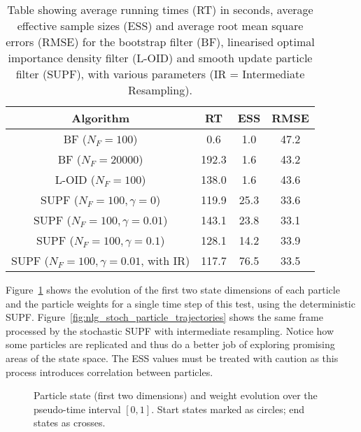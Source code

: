 \documentclass[a4paper,10pt]{article}
\newcommand{\lfdiffsf}{\gamma}                  %
\begin{document}
\begin{table}
\centering
\begin{tabular}{c||c|c|c}
Algorithm                                 & RT    & ESS  & RMSE \\
\hline
BF ($N_F=100$)                            & 0.6   & 1.0  & 47.2 \\
BF ($N_F=20000$)                          & 192.3 & 1.6  & 43.2 \\
L-OID ($N_F=100$)                         & 138.0 & 1.6  & 43.6 \\
SUPF ($N_F=100, \lfdiffsf=0$)             & 119.9 & 25.3 & 33.6 \\
SUPF ($N_F=100, \lfdiffsf=0.01$)          & 143.1 & 23.8 & 33.1 \\
SUPF ($N_F=100, \lfdiffsf=0.1$)           & 128.1 & 14.2 & 33.9 \\
SUPF ($N_F=100, \lfdiffsf=0.01$, with IR) & 117.7 & 76.5 & 33.5 \\
\end{tabular}
\caption{Table showing average running times (RT) in seconds, average effective sample sizes (ESS) and average root mean square errors (RMSE) for the bootstrap filter (BF), linearised optimal importance density filter (L-OID) and smooth update particle filter (SUPF), with various parameters (IR = Intermediate Resampling).}
\label{tab:nlg_results}
\end{table}

Figure~\ref{fig:nlg_deter_particle_trajectories} shows the evolution of the first two state dimensions of each particle and the particle weights for a single time step of this test, using the deterministic SUPF. Figure~\ref{fig:nlg_stoch_particle_trajectories} shows the same frame processed by the stochastic SUPF with intermediate resampling. Notice how some particles are replicated and thus do a better job of exploring promising areas of the state space. The ESS values must be treated with caution as this process introduces correlation between particles.

\begin{figure}
\centering
{}
\caption{Particle state (first two dimensions) and weight evolution over the pseudo-time interval $[0,1]$. Start states marked as circles; end states as crosses.}
\label{fig:nlg_deter_particle_trajectories}
\end{figure}
\end{document}
